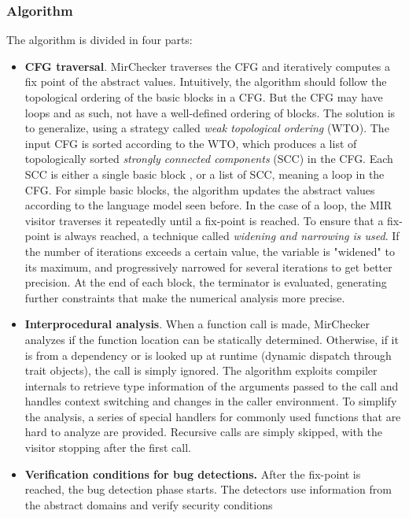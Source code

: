 \documentclass{article}
\begin{document}
\subsubsection{Algorithm}
The algorithm is divided in four parts: \begin{itemize}
    \item \textbf{CFG traversal}. MirChecker traverses the CFG and iteratively computes a fix point of the abstract values. 
    Intuitively, the algorithm should follow the topological ordering of the basic blocks in a CFG. But the CFG may have loops and as such, not have a 
    well-defined ordering of blocks. The solution is to generalize, using a strategy called \textit{weak topological ordering} (WTO). The input CFG 
    is sorted according to the WTO, which produces a list  of topologically sorted \textit{strongly connected components} (SCC) in the CFG. Each SCC is either 
    a single basic block , or a list of SCC, meaning a loop in the CFG. For simple basic blocks, the algorithm updates the abstract values according to the language model 
    seen before. In the case of a loop, the MIR visitor traverses it repeatedly until a fix-point is reached. To ensure that a fix-point is always reached, 
    a technique called \textit{widening and narrowing is used}.  If the number of iterations exceeds a certain value, the variable 
    is "widened" to its maximum, and progressively narrowed for several iterations  to get better precision. At the end of each block, the terminator is evaluated, 
    generating further constraints that make the numerical analysis more precise.
    \item \textbf{Interprocedural analysis}. When a function call is made, MirChecker analyzes if the function 
    location can be statically determined. Otherwise, if it is from a dependency or 
    is looked up at runtime (dynamic dispatch through trait objects), the call is simply ignored. 
        The algorithm exploits compiler internals to retrieve 
    type information of the arguments passed to the call and handles context switching and changes in the caller environment. To simplify the analysis, a series 
    of special handlers for commonly used functions that are hard to analyze are provided. Recursive calls are simply skipped, 
    with the visitor stopping after the first call.
    \item \textbf{Verification conditions for bug detections.} After the fix-point is reached,  
    the bug detection phase starts. The detectors use information from the abstract domains and verify security conditions

\end{itemize}
\end{document}
